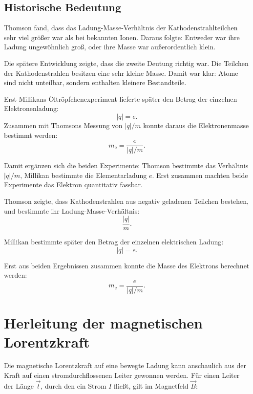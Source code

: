 \subsection*{Historische Bedeutung}

Thomson fand, dass das Ladung-Masse-Verhältnis der Kathodenstrahlteilchen sehr viel
größer war als bei bekannten Ionen. Daraus folgte: Entweder war ihre Ladung
ungewöhnlich groß, oder ihre Masse war außerordentlich klein.

Die spätere Entwicklung zeigte, dass die zweite Deutung richtig war. Die Teilchen der
Kathodenstrahlen besitzen eine sehr kleine Masse. Damit war klar: Atome
sind nicht unteilbar, sondern enthalten kleinere Bestandteile.

Erst Millikans Öltröpfchenexperiment lieferte später den
Betrag der einzelnen Elektronenladung:
\[
|q| = e.
\]
Zusammen mit Thomsons Messung von \(|q|/m\) konnte daraus die Elektronenmasse bestimmt
werden:
\[
m_\mathrm{e}
=
\frac{e}{|q|/m}.
\]

Damit ergänzen sich die beiden Experimente: Thomson bestimmte das Verhältnis
\(|q|/m\), Millikan bestimmte die Elementarladung \(e\). Erst zusammen machten beide
Experimente das Elektron quantitativ fassbar.

\begin{DidacticBox}
	\label{box:thomson-millikan-zusammenhang}
	Thomson zeigte, dass Kathodenstrahlen aus negativ geladenen Teilchen bestehen,
	und bestimmte ihr Ladung-Masse-Verhältnis:
	\[
	\frac{|q|}{m}.
	\]
	
	Millikan bestimmte später den Betrag der einzelnen elektrischen Ladung:
	\[
	|q| = e.
	\]
	
	Erst aus beiden Ergebnissen zusammen konnte die Masse des Elektrons berechnet
	werden:
	\[
	m_\mathrm{e}
	=
	\frac{e}{|q|/m}.
	\]
\end{DidacticBox}

\section{Herleitung der magnetischen Lorentzkraft}
\label{app:herleitung-magnetische-lorentzkraft}

Die magnetische Lorentzkraft auf eine bewegte Ladung kann anschaulich aus
der Kraft auf einen stromdurchflossenen Leiter gewonnen werden. Für einen
Leiter der Länge \(\vec{l}\), durch den ein Strom \(I\) fließt, gilt im
Magnetfeld \(\vec{B}\):

